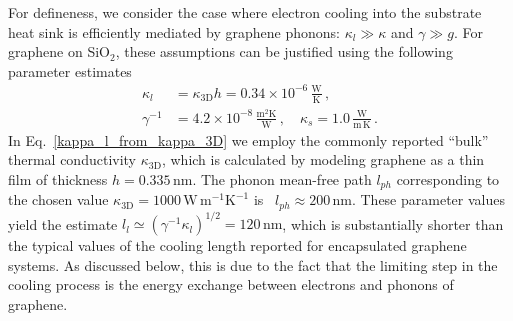 \documentclass[aps, prb, reprint, superscriptaddress]{revtex4-2}
\begin{document}
For defineness, we consider the case where
electron cooling into the substrate heat sink is
efficiently mediated by graphene phonons: $\kappa_l \gg \kappa$ and $\gamma \gg g$.
For graphene on SiO$_2$,
these assumptions can be justified using
the following parameter estimates~\cite{Freitag2009, Pop2012, Zhu2018}
\begin{align}
\kappa_l &= \kappa_{3\mathrm{D}} h
 = 0.34 \times 10^{-6}\, \frac{\mathrm{W}}{\mathrm{K}}\,,
\label{kappa_l_from_kappa_3D}
\\
\gamma^{-1} &= 4.2 \times 10^{-8}\, \frac{\mathrm{m}^2 \mathrm{K}}{\mathrm{W}}\,,
\quad
\kappa_s = 1.0\, \frac{\mathrm{W}}{\mathrm{m}\,\mathrm{K}}\,.
\label{eqn:kappa_estimates}
\end{align}
In Eq.~\eqref{kappa_l_from_kappa_3D} we employ the commonly reported ``bulk'' thermal conductivity $\kappa_{3\mathrm{D}}$, which is calculated by modeling graphene as a thin film of thickness $h = 0.335\, \mathrm{nm}$.
The phonon mean-free path $l_{ph}$ corresponding to the chosen value
$\kappa_{3\mathrm{D}}
= 1000\, \mathrm{W}\, \mathrm{m}^{-1} \mathrm{K}^{-1}$
is~\cite{Pop2012} $l_{ph} \approx 200\,\mathrm{nm}$.
These parameter values yield the estimate $l_l \simeq (\gamma^{-1} \kappa_{l})^{1 / 2} = 120\, \mathrm{nm}$,
which is substantially shorter
than the typical values of the cooling length reported for encapsulated graphene systems. As discussed below, this is due to the fact that the limiting step
in the cooling process is the energy exchange between electrons and phonons of graphene.
 
\end{document}
